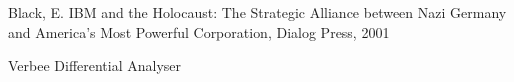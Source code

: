 \documentclass[
12pt,		%
openright,	%
twoside,  %
a4paper,			%
chapter=TITLE,		%
english,			%
french,				%
spanish,			%
brazil				%
]{USPSC-classe/USPSC}
\begin{document}
\begin{flushleft}
\begin{flushleft}
\begin{flushleft}
\begin{flushleft}
\begin{flushleft}
\begin{flushleft}
\begin{flushleft}
\begin{flushleft}
\begin{flushleft}
[BLACK, 2001] Black, E. IBM and the Holocaust: The Strategic Alliance between Nazi Germany and America's Most Powerful Corporation, Dialog Press, 2001
\end{flushleft}


\end{flushleft}


\end{flushleft}


\end{flushleft}


\end{flushleft}


\end{flushleft}


\end{flushleft}


\end{flushleft}


\end{flushleft}


\begin{flushleft}
\begin{flushleft}
\begin{flushleft}
\begin{flushleft}
\begin{flushleft}
\begin{flushleft}
\begin{flushleft}
\begin{flushleft}
\begin{flushleft}
[BRITANNICA, 2022] Verbee Differential Analyser
\end{flushleft}


\end{flushleft}


\end{flushleft}


\end{flushleft}


\end{flushleft}


\end{flushleft}


\end{flushleft}


\end{flushleft}


\end{flushleft}
\end{document}
